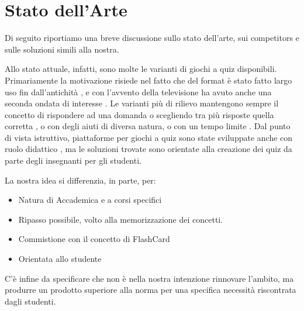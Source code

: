 

\chapter{Stato dell'Arte}
 Di seguito riportiamo una breve discussione sullo stato dell'arte, sui competitors e sulle soluzioni simili alla nostra.
 
 Allo stato attuale, infatti, sono molte le varianti di giochi a quiz disponibili. Primariamente la motivazione risiede nel fatto che del format è stato fatto largo uso fin dall'antichità \cite{quizgame}, e con l'avvento della televisione ha avuto anche una seconda ondata di interesse \cite{gameshow}. Le varianti più di rilievo mantengono sempre il concetto di rispondere ad una domanda o scegliendo tra più risposte quella corretta \cite{whowantstobeamillionaire}, o con degli aiuti di diversa natura, o con un tempo limite \cite{jeopardy}. 
 Dal punto di vista istruttivo, piattaforme per giochi a quiz sono state sviluppate anche con ruolo didattico \cite{quizlet}, ma le soluzioni trovate sono orientate alla creazione dei quiz da parte degli insegnanti per gli studenti.
 
 La nostra idea si differenzia, in parte, per: 
\begin{itemize}
    \item Natura di Accademica e a corsi specifici
    \item Ripasso possibile, volto alla memorizzazione dei concetti.
    \item Commistione con il concetto di FlashCard
    \item Orientata allo studente 
\end{itemize}
 
 C'è infine da specificare che non è nella nostra intenzione rinnovare l'ambito, ma produrre un prodotto superiore alla norma per una specifica necessità riscontrata dagli studenti.
 
